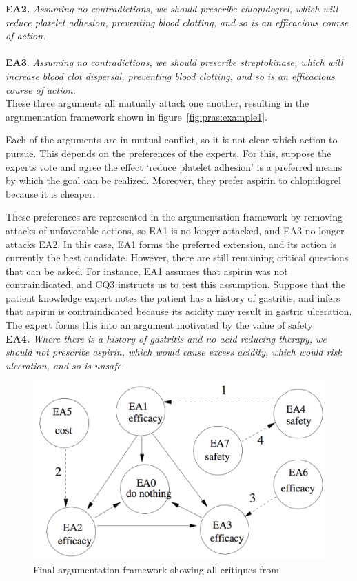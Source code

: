 \documentclass[11.5pt,two column]{llncs}
\begin{document}
\noindent
\textbf{EA2.} \emph{Assuming no contradictions, we should prescribe chlopidogrel, which will reduce platelet adhesion, preventing blood clotting, and so is an efficacious course of action.}\\\\
\textbf{EA3}. \emph{Assuming no contradictions, we should prescribe streptokinase, which will increase blood clot dispersal, preventing blood clotting, and so is an efficacious course of action.}\\

\noindent
These three arguments all mutually attack one another, resulting in the argumentation framework shown in figure~\ref{fig:pras:example1}.


Each of the arguments are in mutual conflict, so it is not clear which action to pursue. This depends on the preferences of the experts. For this, suppose the experts vote and agree the effect `reduce platelet adhesion' is a preferred means by which the goal can be realized. Moreover, they prefer aspirin to chlopidogrel because it is cheaper.

These preferences are represented in the argumentation framework by removing attacks of unfavorable actions, so EA1 is no longer attacked, and EA3 no longer attacks EA2. In this case, EA1 forms the preferred extension, and its action is currently the best candidate. However, there are still remaining critical questions that can be asked. For instance, EA1 assumes that aspirin was not contraindicated, and CQ3 instructs us to test this assumption. Suppose that the patient knowledge expert notes the patient has a history of gastritis, and infers that aspirin is contraindicated because its acidity may result in gastric ulceration. The expert forms this into an argument motivated by the value of safety:\\

\noindent
\textbf{EA4.} \emph{Where there is a history of gastritis and no acid reducing therapy, we should not prescribe aspirin, which would cause excess acidity, which would risk ulceration, and so is unsafe.}\\

\begin{figure}[ht]
\centering
\includegraphics[scale=0.4]{img/pras-example2}
\caption{Final argumentation framework showing all critiques from~\cite{atkinson2006argumentation}}
\label{fig:pras:example2}
\end{figure}
\end{document}
